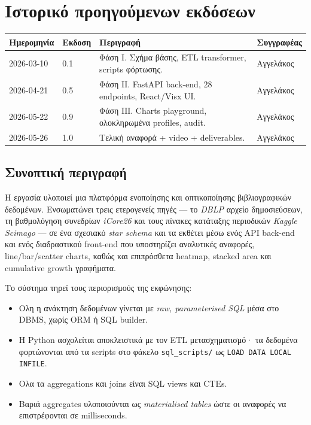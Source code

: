 \chapter*{Ιστορικό προηγούμενων εκδόσεων}

\begin{center}
\begin{tabular}{@{}p{} p{} p{} p{}@{}}
\toprule
\textbf{Ημερομηνία} & \textbf{Εκδοση} & \textbf{Περιγραφή} & \textbf{Συγγραφέας} \\
\midrule
2026-03-10 & 0.1 & Φάση Ι. Σχήμα βάσης, ETL transformer, scripts φόρτωσης. & Αγγελάκος \\
2026-04-21 & 0.5 & Φάση ΙΙ. FastAPI back-end, 28 endpoints, React/Visx UI. & Αγγελάκος \\
2026-05-22 & 0.9 & Φάση ΙΙΙ. Charts playground, ολοκληρωμένα profiles, audit. & Αγγελάκος \\
2026-05-26 & 1.0 & Τελική αναφορά + video + deliverables. & Αγγελάκος \\
\bottomrule
\end{tabular}
\end{center}

\vspace{1cm}

\section*{Συνοπτική περιγραφή}

Η εργασία υλοποιεί μια πλατφόρμα ενοποίησης και οπτικοποίησης βιβλιογραφικών δεδομένων.
Ενσωματώνει τρεις ετερογενείς πηγές --- το \emph{DBLP} αρχείο δημοσιεύσεων, τη βαθμολόγηση
συνεδρίων \emph{iCore26} και τους πίνακες κατάταξης περιοδικών \emph{Kaggle Scimago} ---
σε ένα σχεσιακό \emph{star schema} και τα εκθέτει μέσω ενός API back-end και ενός
διαδραστικού front-end που υποστηρίζει αναλυτικές αναφορές, line/bar/scatter charts,
καθώς και επιπρόσθετα heatmap, stacked area και cumulative growth γραφήματα.

Το σύστημα τηρεί τους περιορισμούς της εκφώνησης:

\begin{itemize}\setlength{\itemsep}{0.2em}
    \item Ολη η ανάκτηση δεδομένων γίνεται με \emph{raw, parameterised SQL} μέσα στο
          DBMS, χωρίς ORM ή SQL builder.
    \item Η Python ασχολείται αποκλειστικά με τον ETL μετασχηματισμό· τα δεδομένα
          φορτώνονται από τα scripts στο φάκελο \texttt{sql\_scripts/} ως
          \texttt{LOAD DATA LOCAL INFILE}.
    \item Ολα τα aggregations και joins είναι SQL views και CTEs.
    \item Βαριά aggregates υλοποιούνται ως \emph{materialised tables} ώστε οι
          αναφορές να επιστρέφονται σε milliseconds.
\end{itemize}

\clearpage
